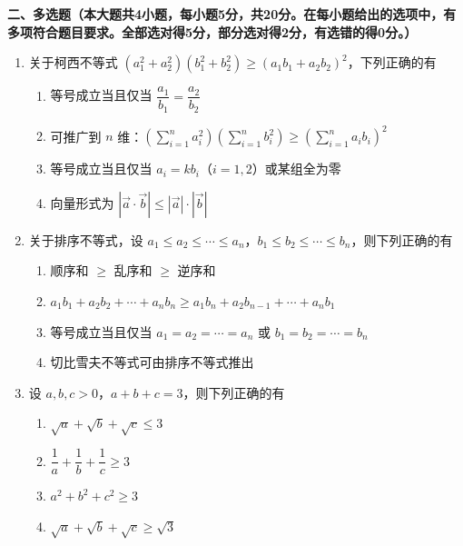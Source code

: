 \documentclass[12pt, a4paper]{ctexart}
\newcommand{\score}[1]{\hfill\makebox[2cm][l]{(#1分)}}
\begin{document}
\noindent\textbf{二、多选题（本大题共4小题，每小题5分，共20分。在每小题给出的选项中，有多项符合题目要求。全部选对得5分，部分选对得2分，有选错的得0分。）}

\vspace{0.3cm}

\begin{enumerate}[resume]
\item 关于柯西不等式 $(a_1^2 + a_2^2)(b_1^2 + b_2^2) \geqslant (a_1 b_1 + a_2 b_2)^2$，下列正确的有\score{5}
\begin{enumerate}[label=\Alph*.]
\item 等号成立当且仅当 $\dfrac{a_1}{b_1} = \dfrac{a_2}{b_2}$
\item 可推广到 $n$ 维：$\left(\displaystyle\sum_{i=1}^{n} a_i^2\right)\left(\displaystyle\sum_{i=1}^{n} b_i^2\right) \geqslant \left(\displaystyle\sum_{i=1}^{n} a_i b_i\right)^2$
\item 等号成立当且仅当 $a_i = kb_i$（$i = 1, 2$）或某组全为零
\item 向量形式为 $|\vec{a} \cdot \vec{b}| \leqslant |\vec{a}| \cdot |\vec{b}|$
\end{enumerate}

\item 关于排序不等式，设 $a_1 \leqslant a_2 \leqslant \cdots \leqslant a_n$，$b_1 \leqslant b_2 \leqslant \cdots \leqslant b_n$，则下列正确的有\score{5}
\begin{enumerate}[label=\Alph*.]
\item 顺序和 $\geqslant$ 乱序和 $\geqslant$ 逆序和
\item $a_1 b_1 + a_2 b_2 + \cdots + a_n b_n \geqslant a_1 b_n + a_2 b_{n-1} + \cdots + a_n b_1$
\item 等号成立当且仅当 $a_1 = a_2 = \cdots = a_n$ 或 $b_1 = b_2 = \cdots = b_n$
\item 切比雪夫不等式可由排序不等式推出
\end{enumerate}

\item 设 $a, b, c > 0$，$a + b + c = 3$，则下列正确的有\score{5}
\begin{enumerate}[label=\Alph*.]
\item $\sqrt{a} + \sqrt{b} + \sqrt{c} \leqslant 3$
\item $\dfrac{1}{a} + \dfrac{1}{b} + \dfrac{1}{c} \geqslant 3$
\item $a^2 + b^2 + c^2 \geqslant 3$
\item $\sqrt{a} + \sqrt{b} + \sqrt{c} \geqslant \sqrt{3}$
\end{enumerate}


\end{enumerate}
\end{document}
